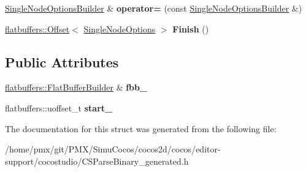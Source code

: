 \begin{DoxyCompactItemize}
\item 
\mbox{\label{structflatbuffers_1_1SingleNodeOptionsBuilder_a2b28ee1e21fda09445a23ff24e6902f9}} 
\hyperlink{structflatbuffers_1_1SingleNodeOptionsBuilder}{Single\+Node\+Options\+Builder} \& {\bfseries operator=} (const \hyperlink{structflatbuffers_1_1SingleNodeOptionsBuilder}{Single\+Node\+Options\+Builder} \&)
\item 
\mbox{\label{structflatbuffers_1_1SingleNodeOptionsBuilder_ad78c5e258aaaac122c73d9cce2efd057}} 
\hyperlink{structflatbuffers_1_1Offset}{flatbuffers\+::\+Offset}$<$ \hyperlink{structflatbuffers_1_1SingleNodeOptions}{Single\+Node\+Options} $>$ {\bfseries Finish} ()
\end{DoxyCompactItemize}
\subsection*{Public Attributes}
\begin{DoxyCompactItemize}
\item 
\mbox{\label{structflatbuffers_1_1SingleNodeOptionsBuilder_af997e962a37958f1c112c2eeeed595a1}} 
\hyperlink{classflatbuffers_1_1FlatBufferBuilder}{flatbuffers\+::\+Flat\+Buffer\+Builder} \& {\bfseries fbb\+\_\+}
\item 
\mbox{\label{structflatbuffers_1_1SingleNodeOptionsBuilder_aa9327a06838935aecdbad2a649605804}} 
flatbuffers\+::uoffset\+\_\+t {\bfseries start\+\_\+}
\end{DoxyCompactItemize}


The documentation for this struct was generated from the following file\+:\begin{DoxyCompactItemize}
\item 
/home/pmx/git/\+P\+M\+X/\+Simu\+Cocos/cocos2d/cocos/editor-\/support/cocostudio/C\+S\+Parse\+Binary\+\_\+generated.\+h\end{DoxyCompactItemize}
